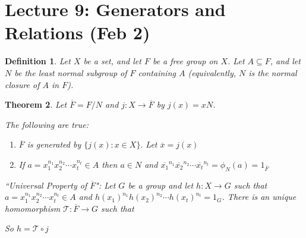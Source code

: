 \documentclass[a4paper,12pt]{article}
\newtheorem{thm}{Theorem}[section]
\newtheorem{defn}[thm]{Definition}
\begin{document}
\section{Lecture 9: Generators and Relations (Feb 2)}
\begin{defn}
    Let $X$ be a set, and let $F$ be a free group on $X$. Let $A \subseteq F$, and let $N$ be the least normal subgroup of $F$ containing $A$ (equivalently, $N$ is the normal closure of $A$ in $F$). 
\end{defn}
\begin{thm}
    Let $\overline{F}=F/N$ and $j:X\to \overline{F}$ by $j(x)=xN$.  \\
    \begin{center}
    \end{center}
    The following are true:
    \begin{enumerate}
        \item $\overline{F}$ is generated by $ \{j(x): x\in X\}.$ Let $\overline{x}=j(x)$
        \item If $a=x_1^{n_1}x_2^{n_2}\cdots x_t^{n_t}\in A$ then $a\in N$ and $\overline{x_1}^{n_1}\overline{x_2}^{n_2}\cdots \overline{x_t}^{n_t}=\phi_N(a)=1_{\overline{F}}$
    \end{enumerate}
    \noindent ``Universal Property of $\overline{F}$": Let $G$ be a group and let $h:X\to G$ such that $a=x_1^{n_1}x_2^{n_2}\cdots x_t^{n_t}\in A$ and $h(x_1)^{n_1}h(x_2)^{n_2}\cdots h(x_t)^{n_t}=1_G$. There is an unique homomorphism $\mathcal{T}:\overline{F}\to G$ such that 
    \begin{center}
    \end{center}
    So $h=\mathcal{T}\circ j$
\end{thm}
\end{document}

